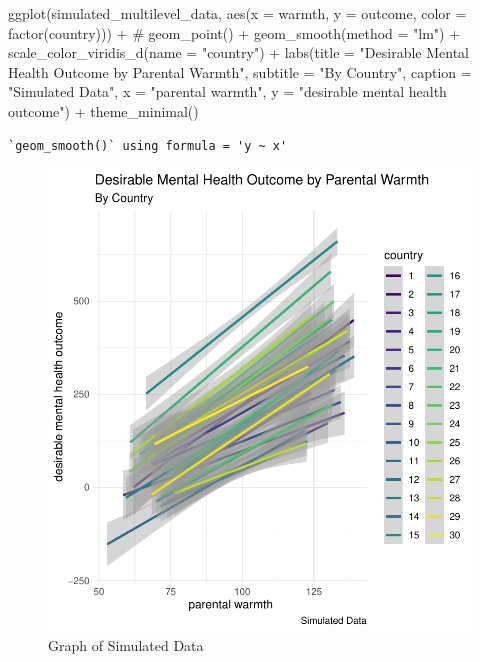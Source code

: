 \documentclass[
  letterpaper,
  DIV=11,
  numbers=noendperiod]{scrreprt}
\newenvironment{Shaded}{\begin{snugshade}}{\end{snugshade}}
\newcommand{\AttributeTok}[1]{\textcolor[rgb]{0.40,0.45,0.13}{#1}}
\newcommand{\CommentTok}[1]{\textcolor[rgb]{0.37,0.37,0.37}{#1}}
\newcommand{\FunctionTok}[1]{\textcolor[rgb]{0.28,0.35,0.67}{#1}}
\newcommand{\NormalTok}[1]{\textcolor[rgb]{0.00,0.23,0.31}{#1}}
\newcommand{\SpecialCharTok}[1]{\textcolor[rgb]{0.37,0.37,0.37}{#1}}
\newcommand{\StringTok}[1]{\textcolor[rgb]{0.13,0.47,0.30}{#1}}
\begin{document}
\begin{Shaded}
\begin{Highlighting}[]
\FunctionTok{ggplot}\NormalTok{(simulated\_multilevel\_data,}
       \FunctionTok{aes}\NormalTok{(}\AttributeTok{x =}\NormalTok{ warmth,}
           \AttributeTok{y =}\NormalTok{ outcome,}
           \AttributeTok{color =} \FunctionTok{factor}\NormalTok{(country))) }\SpecialCharTok{+}
  \CommentTok{\# geom\_point() +}
  \FunctionTok{geom\_smooth}\NormalTok{(}\AttributeTok{method =} \StringTok{"lm"}\NormalTok{) }\SpecialCharTok{+}
  \FunctionTok{scale\_color\_viridis\_d}\NormalTok{(}\AttributeTok{name =} \StringTok{"country"}\NormalTok{) }\SpecialCharTok{+}
  \FunctionTok{labs}\NormalTok{(}\AttributeTok{title =} \StringTok{"Desirable Mental Health Outcome by Parental Warmth"}\NormalTok{,}
       \AttributeTok{subtitle =} \StringTok{"By Country"}\NormalTok{,}
       \AttributeTok{caption =} \StringTok{"Simulated Data"}\NormalTok{,}
       \AttributeTok{x =} \StringTok{"parental warmth"}\NormalTok{,}
       \AttributeTok{y =} \StringTok{"desirable mental health outcome"}\NormalTok{) }\SpecialCharTok{+}
  \FunctionTok{theme\_minimal}\NormalTok{() }
\end{Highlighting}
\end{Shaded}

\begin{verbatim}
`geom_smooth()` using formula = 'y ~ x'
\end{verbatim}

\begin{figure}[H]

{\centering \includegraphics{./simulated-multi-country-data_files/figure-pdf/fig-data-1.pdf}

}

\caption{\label{fig-data}Graph of Simulated Data}

\end{figure}
\end{document}
